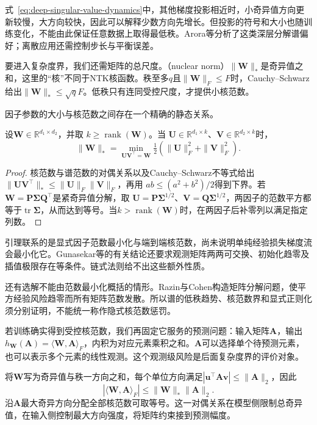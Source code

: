 式~\eqref{eq:deep-singular-value-dynamics}中，其他梯度投影相近时，小奇异值方向更新较慢，大方向较快，因此可以解释少数方向先增长。但投影的符号和大小也随训练变化，不能由此保证任意数据上取得最低秩。Arora等分析了这类深层分解谱偏好；离散应用还需控制步长与平衡误差。

要进入复杂度界，我们还需矩阵的总尺度。（nuclear norm）$\|\bm W\|_*$是奇异值之和，这里的“核”不同于NTK核函数。秩至多$q$且$\|\bm W\|_F\leq F$时，Cauchy--Schwarz给出$\|\bm W\|_*\leq\sqrt qF$。低秩只有连同受控尺度，才提供小核范数。

因子参数的大小与核范数之间存在一个精确的静态关系。
\begin{lemma}[二层分解的范数关系]
\label{lem:factorization-nuclear-norm}
设$\bm W\in\mathbb R^{d_1\times d_2}$，并取
$k\geq\operatorname{rank}(\bm W)$。当
$\bm U\in\mathbb R^{d_1\times k}$、$\bm V\in\mathbb R^{d_2\times k}$时，
\[
 \|\bm W\|_*=\min_{\bm U\bm V^\top=\bm W}
       \tfrac12(\|\bm U\|_F^2+\|\bm V\|_F^2).
\]
\end{lemma}
\begin{proof}
核范数与谱范数的对偶关系以及Cauchy--Schwarz不等式给出
$\|\bm U\bm V^\top\|_*\leq\|\bm U\|_F\|\bm V\|_F$，再用
$ab\leq(a^2+b^2)/2$得到下界。若$\bm W=\bm P\bm\Sigma\bm Q^\top$是紧奇异值分解，取
$\bm U=\bm P\bm\Sigma^{1/2}$、$\bm V=\bm Q\bm\Sigma^{1/2}$，两因子的范数平方都等于$\operatorname{tr}\bm\Sigma$，从而达到等号。当$k>\operatorname{rank}(\bm W)$时，在两因子后补零列以满足指定列数。
\end{proof}

引理联系的是显式因子范数最小化与端到端核范数，尚未说明单纯经验损失梯度流会最小化它。Gunasekar等的有关结论还要求观测矩阵两两可交换、初始化趋零及插值极限存在等条件。链式法则给不出这些额外性质。

还有选解不能由范数最小化概括的情形。Razin与Cohen构造矩阵分解问题，使平方经验风险趋零而所有矩阵范数发散。所以谱的低秩趋势、核范数界和显式正则化须分别证明，不能统一称作隐式核范数惩罚。

若训练确实得到受控核范数，我们再固定它服务的预测问题：输入矩阵$\bm A$，输出$h_{\bm W}(\bm A)=\langle\bm W,\bm A\rangle_F$，内积为对应元素乘积之和。$\bm A$可以选择单个待预测元素，也可以表示多个元素的线性观测。这个观测级风险是后面复杂度界的评价对象。

将$\bm W$写为奇异值与秩一方向之和，每个单位方向满足$|\bm u^\top\bm A\bm v|\leq\|\bm A\|_2$，因此
\[
 |\langle\bm W,\bm A\rangle_F|\leq\|\bm W\|_*\|\bm A\|_2.
\]
沿$\bm A$最大奇异方向分配全部核范数可取等号。这一对偶关系在模型侧限制总奇异值，在输入侧控制最大方向强度，将矩阵约束接到预测幅度。

